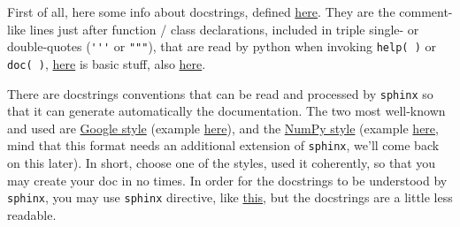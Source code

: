 \documentclass[a4paper,12pt,%
              final%
              ]{article}
\begin{document}
First of all, here some info about docstrings, defined \href{https://www.python.org/dev/peps/pep-0257/}{here}. They are the comment-like lines just after function / class declarations, included in triple single- or double-quotes (\verb|'''| or \verb|"""|), that are read by python when invoking \texttt{help( )} or \texttt{doc( )}, \href{https://www.geeksforgeeks.org/python-docstrings/}{here} is basic stuff, also \href{https://www.programiz.com/python-programming/docstrings}{here}.

There are docstrings conventions that can be read and processed by \texttt{sphinx} so that it can generate automatically the documentation. The two most well-known and used are \href{https://www.programiz.com/python-programming/docstrings}{Google style} (example \href{https://sphinxcontrib-napoleon.readthedocs.io/en/latest/example_google.html}{here}), and the \href{https://numpydoc.readthedocs.io/en/latest/format.html}{NumPy style} (example \href{https://sphinxcontrib-napoleon.readthedocs.io/en/latest/example_numpy.html#example-numpy}{here}, mind that this format needs an additional extension of \texttt{sphinx}, we'll come back on this later). In short, choose one of the styles, used it coherently, so that you may create your doc in no times. In order for the docstrings to be understood by \texttt{sphinx}, you may use \texttt{sphinx} directive, like \href{https://sphinx-rtd-tutorial.readthedocs.io/en/latest/docstrings.html#an-example-class-with-docstrings}{this}, but the docstrings are a little less readable.
\end{document}
